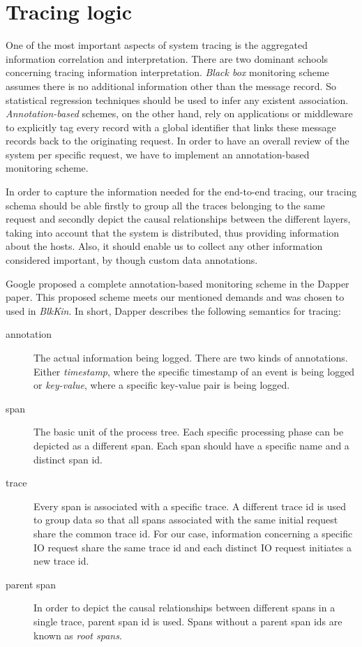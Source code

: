 \documentclass[a4paper,10pt,twocolumn]{article}
\begin{document}
\section{Tracing logic} One of the most important aspects of system tracing is
the aggregated information correlation and interpretation. There are two
dominant schools concerning tracing information interpretation. \emph{Black box}
monitoring scheme assumes there is no additional information other than the
message record. So statistical regression techniques should be used to infer any
existent association. \emph{Annotation-based} schemes, on the other hand, rely
on applications or middleware to explicitly tag every record with a global
identifier that links these message records back to the originating request. In
order to have an overall review of the system per specific request, we have to
implement an annotation-based monitoring scheme.

In order to capture the information needed for the end-to-end tracing, our
tracing schema should be able firstly to group all the traces belonging to the
same request and secondly depict the causal relationships between the different
layers, taking into account that the system is distributed, thus providing
information about the hosts. Also, it should enable us to collect any other
information considered important, by though custom data annotations.

Google proposed a complete annotation-based monitoring scheme in the Dapper
paper\cite{dapper}. This proposed scheme meets our mentioned demands and was
chosen to used in \emph{BlkKin}. In short, Dapper describes the following
semantics for tracing:
\begin{description}
\item[annotation]
The actual information being logged. There are two kinds of annotations. Either
\emph{timestamp}, where the specific timestamp of an event is being logged or 
\emph{key-value}, where a specific key-value pair is being logged.
\item[span]
The basic unit of the process tree. Each specific processing phase can be 
depicted as a different span. Each span should have a specific name and a 
distinct span id.
\item[trace]
Every span is associated with a specific trace. A different trace id is used to
group data so that all spans associated with the same initial request share the
common trace id. For our case, information concerning a specific IO request
share the same trace id and each distinct IO request initiates a new trace id.
\item[parent span] 
In order to depict the causal relationships between different spans in a single
trace, parent span id is used. Spans without a parent span ids are  known as 
\emph{root spans}.
\end{description}
\end{document}
